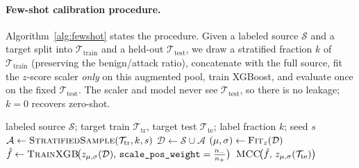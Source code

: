 \documentclass[preprint,12pt,authoryear]{elsarticle}
\begin{document}
\paragraph{Few-shot calibration procedure.} Algorithm~\ref{alg:fewshot} states the
procedure. Given a labeled source $\mathcal{S}$ and a target split into
$\mathcal{T}_{\text{train}}$ and a held-out $\mathcal{T}_{\text{test}}$, we draw a
stratified fraction $k$ of $\mathcal{T}_{\text{train}}$ (preserving the
benign/attack ratio), concatenate with the full source, fit the $z$-score scaler
\emph{only} on this augmented pool, train XGBoost, and evaluate once on the fixed
$\mathcal{T}_{\text{test}}$. The scaler and model never see
$\mathcal{T}_{\text{test}}$, so there is no leakage; $k=0$ recovers zero-shot.

\begin{algorithm}[h]
\caption{Few-shot cross-network calibration}
\label{alg:fewshot}
\begin{algorithmic}[1]
\Require labeled source $\mathcal{S}$; target train $\mathcal{T}_{\text{tr}}$,
target test $\mathcal{T}_{\text{te}}$; label fraction $k$; seed $s$
\State $\mathcal{A} \gets \textsc{StratifiedSample}(\mathcal{T}_{\text{tr}}, k, s)$
\State $\mathcal{D} \gets \mathcal{S} \cup \mathcal{A}$
\State $(\mu,\sigma) \gets \textsc{Fit}_{z}(\mathcal{D})$
\State $\hat{f} \gets \textsc{TrainXGB}\!\big(z_{\mu,\sigma}(\mathcal{D}),\,
\texttt{scale\_pos\_weight}=\tfrac{n_-}{n_+}\big)$
\State \Return $\textsc{MCC}\!\big(\hat{f},\, z_{\mu,\sigma}(\mathcal{T}_{\text{te}})\big)$
\end{algorithmic}
\end{algorithm}
\end{document}
